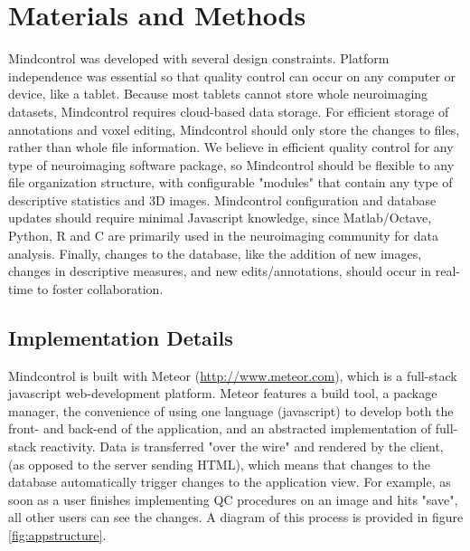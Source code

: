 \section{Materials and Methods}

Mindcontrol was developed with several design constraints. Platform independence was essential so that quality control can occur on any computer or device, like a tablet. Because most tablets cannot store whole neuroimaging datasets, Mindcontrol requires cloud-based data storage. For efficient storage of annotations and voxel editing, Mindcontrol should only store the changes to files, rather than whole file information. We believe in efficient quality control for any type of neuroimaging software package, so Mindcontrol should be flexible to any file organization structure, with configurable "modules" that contain any type of descriptive statistics and 3D images. Mindcontrol configuration and database updates should require minimal Javascript knowledge, since Matlab/Octave, Python, R and C are primarily used in the neuroimaging community for data analysis. Finally, changes to the database, like the addition of new images, changes in descriptive measures, and new edits/annotations, should occur in real-time to foster collaboration.  


\subsection{Implementation Details}

Mindcontrol is built with Meteor (\href{http://www.meteor.com}{http://www.meteor.com}), which is a full-stack javascript web-development platform. Meteor features a build tool, a package manager, the convenience of using one language (javascript) to develop both the front- and back-end of the application, and an abstracted implementation of full-stack reactivity. Data is transferred "over the wire" and rendered by the client, (as opposed to the server sending HTML), which means that changes to the database automatically trigger changes to the application view. For example, as soon as a user finishes implementing QC procedures on an image and hits "save", all other users can see the changes. A diagram of this process is provided in figure \ref{fig:appstructure}.



